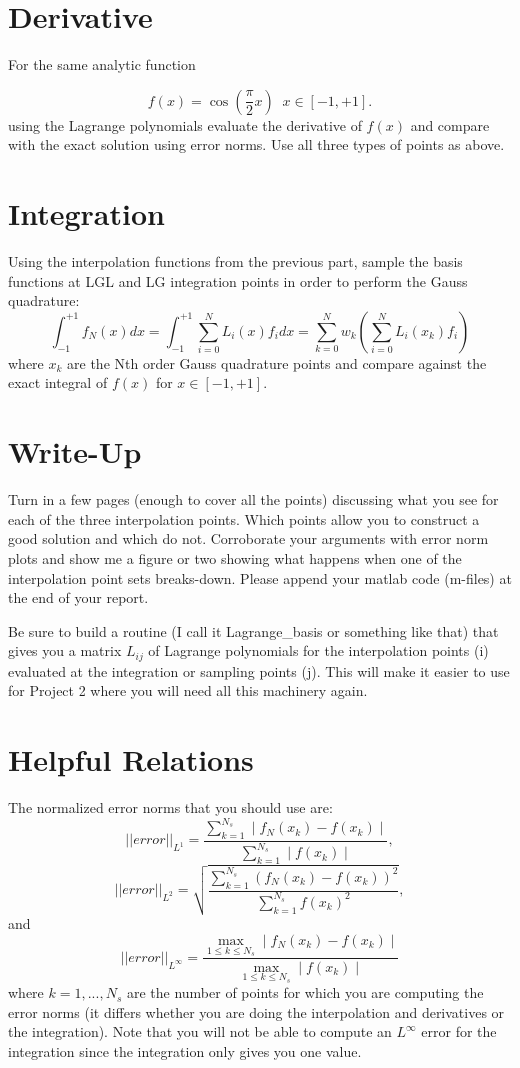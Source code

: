 \documentclass[10pt]{article}
\newcommand{\be}{\begin{equation}}
\newcommand{\ee}{\end{equation}}
\begin{document}
\section{Derivative}
For the same analytic function

\be
f(x)=\cos \left( \frac{\pi}{2} x \right)\; \; x \in [-1,+1].
\ee
using the Lagrange polynomials evaluate the derivative of $f(x)$ and compare with the exact solution using error norms. Use all three types of points as above.

\section{Integration}
Using the interpolation functions from the previous part, sample the basis functions at LGL and LG integration points in order to perform the Gauss quadrature:
\be
\int_{-1}^{+1} f_N(x) dx = \int_{-1}^{+1} \sum_{i=0}^N L_i(x) f_i dx = \sum_{k=0}^{N} w_k \left( \sum_{i=0}^N L_i(x_k) f_i \right)
\ee
where $x_k$ are the Nth order Gauss quadrature points and compare against the exact integral of $f(x)$ for $x \in [-1,+1]$. 

\section{Write-Up}
Turn in a few pages (enough to cover all the points) discussing what you see for each of the three interpolation points. Which points allow you to construct a good 
solution and which do not. Corroborate your arguments with error norm plots and show me a figure or two showing what happens when one of the interpolation point sets 
breaks-down. Please append your matlab code (m-files) at the end of your report. 

Be sure to build a routine (I call it Lagrange\_basis or something like that) that gives you a 
matrix $L_{ij}$ of Lagrange polynomials for the interpolation points (i) evaluated at the integration or sampling points (j). This will make it easier to use for Project 2 where you will need all this 
machinery again.


\section{Helpful Relations}
The normalized error norms that you should use are:
\be
||error||_{L^1} = \frac{ \sum_{k=1}^{N_s}  \mid f_N(x_k) - f(x_k) \mid }{ \sum_{k=1}^{N_s} \mid f(x_k) \mid },
\ee
\be
||error||_{L^2} = \sqrt{ \frac{ \sum_{k=1}^{N_s}  \left( f_N(x_k) - f(x_k) \right)^2}{ \sum_{k=1}^{N_s} f(x_k) ^2} },
\ee
and
\be
||error||_{L^{\infty}} = \frac{ \max_{1\leq k \leq N_s} \mid f_N(x_k) - f(x_k) \mid }{ \max_{1\leq k \leq N_s} \mid f(x_k) \mid }
\ee
where $k=1,...,N_s$ are the number of points for which you are computing the error norms (it differs whether you are doing the interpolation and derivatives or the integration).
Note that you will not be able to compute an $L^{\infty}$ error for the integration since the integration only gives you one value.
\end{document}

